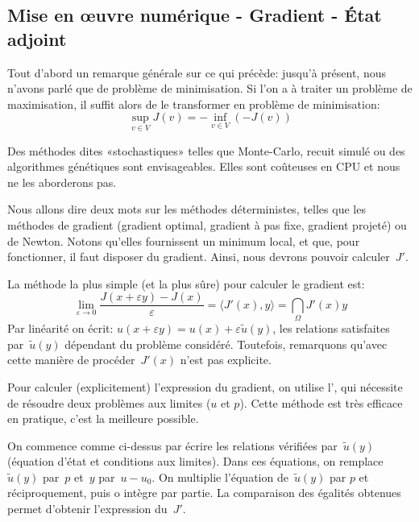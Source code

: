 \medskip
\subsection{Mise en œuvre numérique - Gradient - État adjoint}

Tout d'abord un remarque générale sur ce qui précède:
jusqu'à présent, nous n'avons parlé que de problème de minimisation.
Si l'on a à traiter un problème de maximisation, il suffit alors de le transformer en problème de minimisation:
\begin{equation}
\sup_{v\in V} J(v)=-\inf_{v\in V} (-J(v))
\end{equation}

\medskip
Des méthodes dites «stochastiques» telles que Monte-Carlo, recuit simulé ou des algorithmes génétiques sont envisageables. Elles sont coûteuses en CPU et nous ne les aborderons pas.

Nous allons dire deux mots sur les méthodes déterministes, telles que les méthodes de gradient (gradient optimal, gradient à pas fixe, gradient projeté) ou de Newton. Notons qu'elles fournissent un minimum local, et que, pour fonctionner, il faut disposer du gradient. Ainsi, nous devrons pouvoir calculer~$J'$.

\medskip
La méthode la plus simple (et la plus sûre) pour calculer le gradient est:
\begin{equation}
\lim_{\varepsilon\rightarrow0} \dfrac{J(x+\varepsilon y)-J(x)}{\varepsilon}
=\langle J'(x),y\rangle =\dint_\Omega J'(x)y
\end{equation}
Par linéarité on écrit: $u(x+\varepsilon y)=u(x)+\varepsilon \tilde{u}(y)$, les relations satisfaites par~$\tilde{u}(y)$ dépendant du problème considéré.
Toutefois, remarquons qu'avec cette manière de procéder~$J'(x)$ n'est pas explicite.

\medskip
Pour calculer (explicitement) l'expression du gradient, on utilise l', qui nécessite de résoudre deux problèmes aux limites ($u$ et $p$).
Cette méthode est très efficace en pratique, c'est la meilleure possible.

On commence comme ci-dessus par écrire les relations vérifiées par~$\tilde{u}(y)$ (équation d'état et conditions aux limites). Dans ces équations, on remplace~$\tilde{u}(y)$ par~$p$ et~$y$ par~$u-u_0$. On multiplie l'équation de~$\tilde{u}(y)$ par $p$ et réciproquement, puis o intègre par partie. La comparaison des égalités obtenues permet d'obtenir l'expression du~$J'$.

